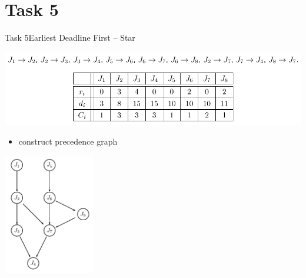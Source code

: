 
\section{Task 5}

\setcounter{task}{1}

\begin{frame}[allowframebreaks]{Task 5}{Earliest Deadline First – Star\vspace{0.5cm}}
  \begin{tasknoinc}
    \includegraphics[width=\textwidth]{./figures/5_task.png}
    \begin{itemize}
      \item construct \alert{precedence graph}
    \end{itemize}
  \end{tasknoinc}
  \begin{solutionnoinc}
    \centering
    \includegraphics[width=0.3\textwidth]{./figures/5_graph.png}
  \end{solutionnoinc}
\end{frame}

